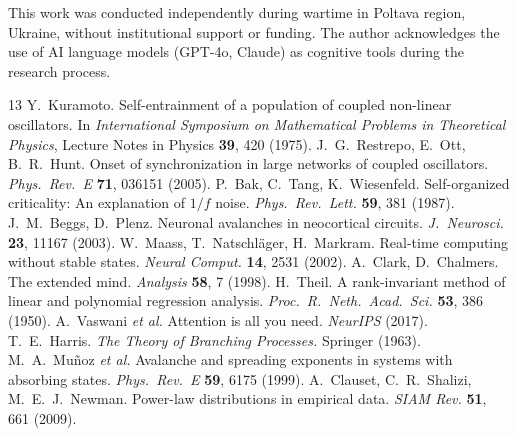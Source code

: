 \documentclass[11pt,a4paper,twocolumn]{article}
\begin{document}
This work was conducted independently during wartime in Poltava region, Ukraine, without institutional support or funding. The author acknowledges the use of AI language models (GPT-4o, Claude) as cognitive tools during the research process.

\begin{thebibliography}{13}
 Y.~Kuramoto. Self-entrainment of a population of coupled non-linear oscillators. In \emph{International Symposium on Mathematical Problems in Theoretical Physics}, Lecture Notes in Physics \textbf{39}, 420 (1975).
 J.~G.~Restrepo, E.~Ott, B.~R.~Hunt. Onset of synchronization in large networks of coupled oscillators. \emph{Phys.\ Rev.\ E} \textbf{71}, 036151 (2005).
 P.~Bak, C.~Tang, K.~Wiesenfeld. Self-organized criticality: An explanation of $1/f$ noise. \emph{Phys.\ Rev.\ Lett.} \textbf{59}, 381 (1987).
 J.~M.~Beggs, D.~Plenz. Neuronal avalanches in neocortical circuits. \emph{J.\ Neurosci.} \textbf{23}, 11167 (2003).
 W.~Maass, T.~Natschl\"ager, H.~Markram. Real-time computing without stable states. \emph{Neural Comput.} \textbf{14}, 2531 (2002).
 A.~Clark, D.~Chalmers. The extended mind. \emph{Analysis} \textbf{58}, 7 (1998).
 H.~Theil. A rank-invariant method of linear and polynomial regression analysis. \emph{Proc.\ R.\ Neth.\ Acad.\ Sci.} \textbf{53}, 386 (1950).
 A.~Vaswani \emph{et al.} Attention is all you need. \emph{NeurIPS} (2017).
 T.~E.~Harris. \emph{The Theory of Branching Processes.} Springer (1963).
 M.~A.~Mu\~noz \emph{et al.} Avalanche and spreading exponents in systems with absorbing states. \emph{Phys.\ Rev.\ E} \textbf{59}, 6175 (1999).
 A.~Clauset, C.~R.~Shalizi, M.~E.~J.~Newman. Power-law distributions in empirical data. \emph{SIAM Rev.} \textbf{51}, 661 (2009).
\end{thebibliography}
\end{document}
